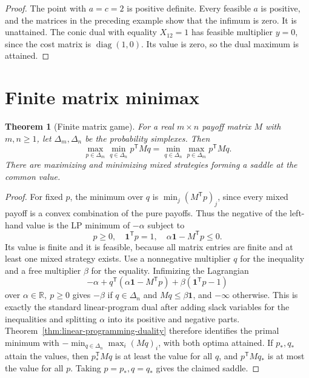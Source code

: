 \documentclass[11pt,oneside,openany]{book}
\newcommand{\R}{\mathbb R}
\theoremstyle{plain}
\newtheorem{theorem}{Theorem}[chapter]
\theoremstyle{definition}
\theoremstyle{remark}
\begin{document}
\begin{proof}
The point with \(a=c=2\) is positive definite.
Every feasible \(a\) is positive, and the matrices
in the preceding example show that the infimum
is zero. It is unattained. The conic dual with
equality \(X_{12}=1\) has feasible multiplier
\(y=0\), since the cost matrix is
\(\operatorname{diag}(1,0)\). Its value is zero,
so the dual maximum is attained.
\end{proof}

\section{Finite matrix minimax}
\label{v05-06}

\begin{theorem}[Finite matrix game]\label{thm:matrix-minimax}
For a real \(m\times n\) payoff matrix \(M\) with
\(m,n\ge1\), let \(\Delta_m,\Delta_n\) be the
probability simplexes. Then
\[
 \max_{p\in\Delta_m}\min_{q\in\Delta_n}p^{\mathsf T}Mq
 =
 \min_{q\in\Delta_n}\max_{p\in\Delta_m}p^{\mathsf T}Mq .
\]
There are maximizing and minimizing mixed strategies
forming a saddle at the common value.
\end{theorem}

\begin{proof}
For fixed \(p\), the minimum over \(q\) is
\(\min_j(M^{\mathsf T}p)_j\), since every mixed
payoff is a convex combination of the pure payoffs.
Thus the negative of the left-hand value is the
LP minimum of \(-\alpha\) subject to
\[
 p\ge0,\quad \mathbf1^{\mathsf T}p=1,\quad
 \alpha\mathbf1-M^{\mathsf T}p\le0.
\]
Its value is finite and it is feasible, because all
matrix entries are finite and at least one mixed
strategy exists. Use a nonnegative multiplier \(q\)
for the inequality and a free multiplier \(\beta\)
for the equality. Infimizing the Lagrangian
\[
 -\alpha+q^{\mathsf T}(\alpha\mathbf1-M^{\mathsf T}p)
       +\beta(\mathbf1^{\mathsf T}p-1)
\]
over \(\alpha\in\R,\ p\ge0\) gives \(-\beta\) if
\(q\in\Delta_n\) and \(Mq\le\beta\mathbf1\),
and \(-\infty\) otherwise.
This is exactly the standard linear-program dual
after adding slack variables for the inequalities
and splitting \(\alpha\) into its positive and
negative parts. Theorem~\ref{thm:linear-programming-duality}
therefore identifies the primal minimum with
\(-\min_{q\in\Delta_n}\max_i(Mq)_i\), with both
optima attained. If \(p_*,q_*\) attain the values,
then \(p_*^{\mathsf T}Mq\) is at least the value
for all \(q\), and \(p^{\mathsf T}Mq_*\) is at most
the value for all \(p\). Taking \(p=p_*,q=q_*\)
gives the claimed saddle.
\end{proof}
\end{document}
